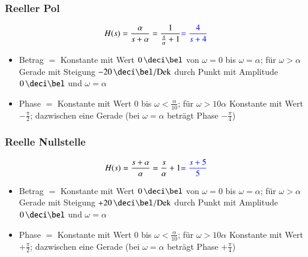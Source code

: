 \subsubsection{Reeller Pol}

\begin{minipage}[t]{0.48\columnwidth}
    $$ H(s) = \frac{\alpha}{s + \alpha} = \frac{1}{\frac{s}{\alpha} + 1} {\color{blue}= \frac{4}{s + 4}} $$
    
\end{minipage}
\hfill
\begin{minipage}[t]{0.48\columnwidth}
    \begin{itemize}
        \item Betrag $=$ Konstante mit Wert $0 \, \deci \bel$ von $\omega = 0$ bis $\omega = \alpha$; 
                für $\omega > \alpha$ Gerade mit Steigung $- 20 \, \deci \bel / \Dek$ 
                durch Punkt mit Amplitude $0 \, \deci \bel$ und $\omega = \alpha$
        \item Phase $=$ Konstante mit Wert $0$ bis $\omega < \frac{\alpha}{10}$; 
                für $\omega > 10 \alpha$ Konstante mit Wert $- \frac{\pi}{2}$; dazwischen eine Gerade
                (bei $\omega = \alpha$ beträgt Phase $- \frac{\pi}{4}$)
    \end{itemize}
\end{minipage}


\subsubsection{Reelle Nullstelle}

\begin{minipage}[t]{0.48\columnwidth}
    $$ H(s) = \frac{s + \alpha}{\alpha} = \frac{s}{\alpha} + 1 {\color{blue}= \frac{s + 5}{5}} $$
    
\end{minipage}
\hfill
\begin{minipage}[t]{0.48\columnwidth}
    \begin{itemize}
        \item Betrag $=$ Konstante mit Wert $0 \, \deci \bel$ von $\omega = 0$ bis $\omega = \alpha$; 
                für $\omega > \alpha$ Gerade mit Steigung $+ 20 \, \deci \bel / \Dek$ 
                durch Punkt mit Amplitude $0 \, \deci \bel$ und $\omega = \alpha$
        \item Phase $=$ Konstante mit Wert $0$ bis $\omega < \frac{\alpha}{10}$; 
                für $\omega > 10 \alpha$ Konstante mit Wert $+ \frac{\pi}{2}$; dazwischen eine Gerade
                (bei $\omega = \alpha$ beträgt Phase $+ \frac{\pi}{4}$)
    \end{itemize}
\end{minipage}
    

